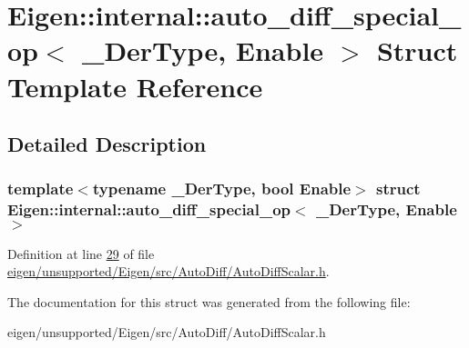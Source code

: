 \hypertarget{struct_eigen_1_1internal_1_1auto__diff__special__op}{}\section{Eigen\+:\+:internal\+:\+:auto\+\_\+diff\+\_\+special\+\_\+op$<$ \+\_\+\+Der\+Type, Enable $>$ Struct Template Reference}
\label{struct_eigen_1_1internal_1_1auto__diff__special__op}


\subsection{Detailed Description}
\subsubsection*{template$<$typename \+\_\+\+Der\+Type, bool Enable$>$\newline
struct Eigen\+::internal\+::auto\+\_\+diff\+\_\+special\+\_\+op$<$ \+\_\+\+Der\+Type, Enable $>$}



Definition at line \hyperlink{eigen_2unsupported_2_eigen_2src_2_auto_diff_2_auto_diff_scalar_8h_source_l00029}{29} of file \hyperlink{eigen_2unsupported_2_eigen_2src_2_auto_diff_2_auto_diff_scalar_8h_source}{eigen/unsupported/\+Eigen/src/\+Auto\+Diff/\+Auto\+Diff\+Scalar.\+h}.



The documentation for this struct was generated from the following file\+:\begin{DoxyCompactItemize}
\item 
eigen/unsupported/\+Eigen/src/\+Auto\+Diff/\+Auto\+Diff\+Scalar.\+h\end{DoxyCompactItemize}
